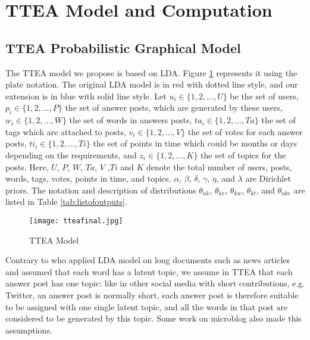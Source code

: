 {{{{{{{\section{TTEA Model and Computation}
\subsection{TTEA Probabilistic Graphical Model}

The TTEA model we propose is based on LDA. Figure \ref{fig:tteamodel} represents it using the plate notation. The original LDA model is in red with dotted line style, and our extension is in blue with solid line style. Let $u_i \in \{1, 2,..., U\}$ be the set of users, $p_i \in \{1, 2,..., P\}$ the set of answer posts, which are generated by these users, $w_i \in \{1, 2,..., W\}$ the set of words in answers posts, $ta_i \in \{1, 2,..., Ta\}$ the set of tags which are attached to posts, $v_i \in \{1, 2,..., V\}$ the set of votes for each answer posts, $ti_i \in \{1, 2,..., Ti\}$ the set of points in time which could be months or days depending on the requirements, and $z_i \in \{1, 2,..., K\}$ the set of topics for the posts. Here, $U$, $P$, $W$, $Ta$, $V$ ,$Ti$ and $K$ denote the total number of users, posts, words, tags, votes, points in time, and topics. $\alpha$, $\beta$, $\delta$, $\gamma$, $\eta$, and $\lambda$ are Dirichlet priors. The notation and description of distributions $\theta_{uk}$, $\theta_{kv}$, $\theta_{kw}$, $\theta_{kt}$, and $\theta_{uke}$ are listed in Table \ref{tab:listofoutputs}.

\begin{figure}
\centering
\texttt{[image: tteafinal.jpg]}  
\caption{TTEA Model}
\label{fig:tteamodel} 
\end{figure}

Contrary to \cite{blei2003latent} who applied LDA model on long documents such as news articles and assumed that each word has a latent topic, we assume in TTEA that each answer post has one topic: like in other social media with short contributions, e.g. Twitter, an answer post is normally short, each answer post is therefore suitable to be assigned with one single latent topic, and all the words in that post are considered to be generated by this topic. Some work \cite{chp7zhao2011comparing}\cite{chp7diao2012finding} on microblog also made this assumptions.

}}}}}}}
